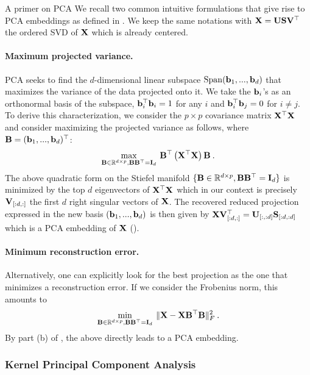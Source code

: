 \begin{mem1}{A primer on PCA}\label{memo:PCA}
	We recall two common intuitive formulations that give rise to PCA embeddings as defined in . We keep the same notations with ${\mathbf{X}} = {\mathbf{U}} {\mathbf{S}} {\mathbf{V}}^\top$ the ordered SVD of ${\mathbf{X}}$ which is already centered.

	\paragraph{Maximum projected variance.} PCA seeks to find the $d$-dimensional linear subspace $\mathrm{Span}({\mathbf{b}}_1, ..., {\mathbf{b}}_d)$ that maximizes the variance of the data projected onto it. We take the ${\mathbf{b}}_i$'s as an orthonormal basis of the subspace, \ie ${\mathbf{b}}_i^\top {\mathbf{b}}_i = 1$ for any $i$ and ${\mathbf{b}}_i^\top {\mathbf{b}}_j = 0$ for $i \neq j$.
	To derive this characterization, we consider the $p \times p$ covariance matrix ${\mathbf{X}}^\top {\mathbf{X}}$ and consider maximizing the projected variance as follows, where ${\mathbf{B}} = ({\mathbf{b}}_1, ..., {\mathbf{b}}_d)^\top$:
	\begin{align}
		\max_{{\mathbf{B}} \in \mathbb{R}^{d \times p}, {\mathbf{B}} {\mathbf{B}}^\top = {\mathbf{I}}_d} \: {\mathbf{B}}^\top \left({\mathbf{X}}^\top {\mathbf{X}} \right) {\mathbf{B}} \:.
	\end{align}
	The above quadratic form on the Stiefel manifold $\{{\mathbf{B}} \in \mathbb{R}^{d \times p}, {\mathbf{B}} {\mathbf{B}}^\top = {\mathbf{I}}_d \}$ is minimized by the top $d$ eigenvectors of ${\mathbf{X}}^\top {\mathbf{X}}$ \citep{absil2008optimization} which in our context is precisely ${\mathbf{V}}_{[:d,:]}$ the first $d$ right singular vectors of ${\mathbf{X}}$. The recovered reduced projection expressed in the new basis $({\mathbf{b}}_1, ..., {\mathbf{b}}_d)$ is then given by ${\mathbf{X}} {\mathbf{V}}_{[:d,:]}^\top = {\mathbf{U}}_{[:,:d]} {\mathbf{S}}_{[:d,:d]}$ which is a PCA embedding of ${\mathbf{X}}$ ().

	\paragraph{Minimum reconstruction error.} Alternatively, one can explicitly look for the best projection as the one that minimizes a reconstruction error. If we consider the Frobenius norm, this amounts to 
	\begin{align}
		\min_{{\mathbf{B}} \in \mathbb{R}^{d \times p}, {\mathbf{B}} {\mathbf{B}}^\top = {\mathbf{I}}_d} \: \| {\mathbf{X}} - {\mathbf{X}} {\mathbf{B}}^\top {\mathbf{B}} \|_F^2 \:.
	\end{align}
	By part (b) of , the above directly leads to a PCA embedding.
\end{mem1}
	

\subsubsection{Kernel Principal Component Analysis}

